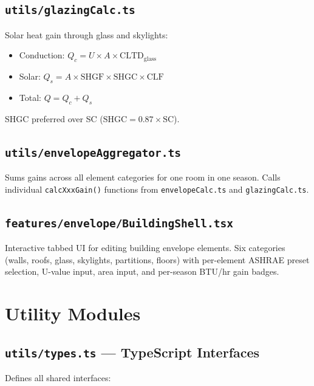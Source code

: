 \documentclass[12pt, a4paper, oneside]{report}
\newcommand{\file}[1]{\texttt{\textcolor{codeblue}{#1}}}
\newcommand{\code}[1]{\texttt{\textcolor{codered}{#1}}}
\begin{document}
\section{\file{utils/glazingCalc.ts}}

Solar heat gain through glass and skylights:
\begin{itemize}
  \item Conduction: $Q_c = U \times A \times \text{CLTD}_{\text{glass}}$
  \item Solar: $Q_s = A \times \text{SHGF} \times \text{SHGC} \times \text{CLF}$
  \item Total: $Q = Q_c + Q_s$
\end{itemize}

SHGC preferred over SC ($\text{SHGC} = 0.87 \times \text{SC}$).

\section{\file{utils/envelopeAggregator.ts}}

Sums gains across all element categories for one room in one season. Calls individual \code{calcXxxGain()} functions from \file{envelopeCalc.ts} and \file{glazingCalc.ts}.

\section{\file{features/envelope/BuildingShell.tsx}}

Interactive tabbed UI for editing building envelope elements. Six categories (walls, roofs, glass, skylights, partitions, floors) with per-element ASHRAE preset selection, U-value input, area input, and per-season BTU/hr gain badges.


\chapter{Utility Modules}

\section{\file{utils/types.ts} --- TypeScript Interfaces}

Defines all shared interfaces:
\end{document}
